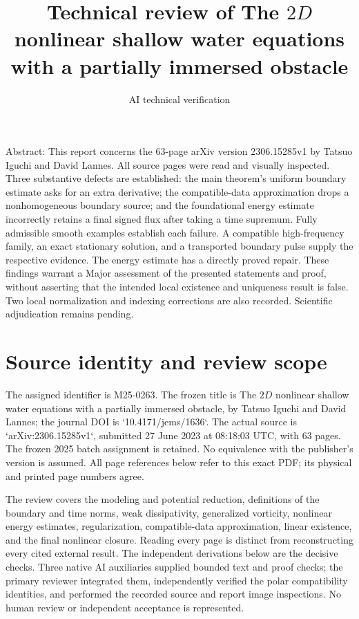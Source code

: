 \documentclass[10pt]{article}
\title{Technical review of
The \(2D\) nonlinear shallow water equations
with a partially immersed obstacle}
\author{AI technical verification}
\date{}
\begin{document}
\maketitle
Abstract: This report concerns the 63-page arXiv version 2306.15285v1 by Tatsuo Iguchi and David Lannes. All source pages were read and visually inspected. Three substantive defects are established: the main theorem’s uniform boundary estimate asks for an extra derivative; the compatible-data approximation drops a nonhomogeneous boundary source; and the foundational energy estimate incorrectly retains a final signed flux after taking a time supremum. Fully admissible smooth examples establish each failure. A compatible high-frequency family, an exact stationary solution, and a transported boundary pulse supply the respective evidence. The energy estimate has a directly proved repair. These findings warrant a Major assessment of the presented statements and proof, without asserting that the intended local existence and uniqueness result is false. Two local normalization and indexing corrections are also recorded. Scientific adjudication remains pending.\par
\section*{Source identity and review scope}
The assigned identifier is M25-0263. The frozen title is The \(2D\) nonlinear shallow water equations with a partially immersed obstacle, by Tatsuo Iguchi and David Lannes; the journal DOI is `10.4171/jems/1636`. The actual source is `arXiv:2306.15285v1`, submitted 27 June 2023 at 08:18:03 UTC, with 63 pages. The frozen 2025 batch assignment is retained. No equivalence with the publisher’s version is assumed. All page references below refer to this exact PDF; its physical and printed page numbers agree.\par
The review covers the modeling and potential reduction, definitions of the boundary and time norms, weak dissipativity, generalized vorticity, nonlinear energy estimates, regularization, compatible-data approximation, linear existence, and the final nonlinear closure. Reading every page is distinct from reconstructing every cited external result. The independent derivations below are the decisive checks. Three native AI auxiliaries supplied bounded text and proof checks; the primary reviewer integrated them, independently verified the polar compatibility identities, and performed the recorded source and report image inspections. No human review or independent acceptance is represented.\par
\end{document}
